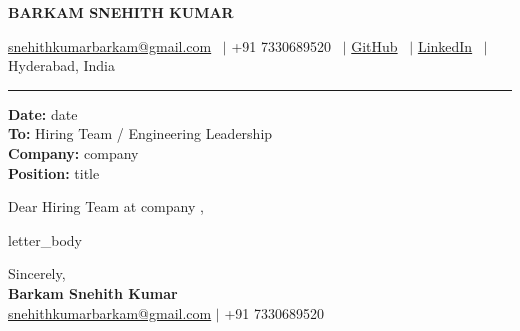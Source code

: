 \documentclass[10pt,a4paper]{article}
\begin{document}

\begin{center}

{\Huge\textbf{BARKAM SNEHITH KUMAR}}

\vspace{3pt}

\small
\href{mailto:snehithkumarbarkam@gmail.com}{snehithkumarbarkam@gmail.com}
\ $|$ +91 7330689520
\ $|$
\href{https://github.com/snehithkumar18}{GitHub}
\ $|$
\href{https://www.linkedin.com/in/snehith-kumar-4266071b8/}{LinkedIn}
\ $|$ Hyderabad, India

\end{center}

\vspace{-4pt}
\hrule
\vspace{8pt}


\textbf{Date:} {{ date }} \\
\textbf{To:} Hiring Team / Engineering Leadership \\
\textbf{Company:} {{ company }} \\
\textbf{Position:} {{ title }}

\vspace{6pt}

Dear Hiring Team at {{ company }},

{{ letter_body }}

\vspace{10pt}

Sincerely, \\
\textbf{Barkam Snehith Kumar} \\
\href{mailto:snehithkumarbarkam@gmail.com}{snehithkumarbarkam@gmail.com} $|$ +91 7330689520
\end{document}
